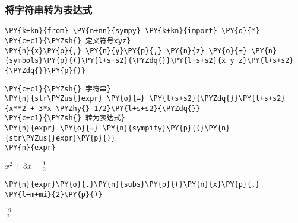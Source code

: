     \hypertarget{ux5c06ux5b57ux7b26ux4e32ux8f6cux4e3aux8868ux8fbeux5f0f}{%
\subsubsection{将字符串转为表达式}\label{ux5c06ux5b57ux7b26ux4e32ux8f6cux4e3aux8868ux8fbeux5f0f}}

    \begin{tcolorbox}[breakable, size=fbox, boxrule=1pt, pad at break*=1mm,colback=cellbackground, colframe=cellborder]
\begin{Verbatim}[commandchars=\\\{\}]
\PY{k+kn}{from} \PY{n+nn}{sympy} \PY{k+kn}{import} \PY{o}{*}
\PY{c+c1}{\PYZsh{} 定义符号xyz}
\PY{n}{x}\PY{p}{,} \PY{n}{y}\PY{p}{,} \PY{n}{z} \PY{o}{=} \PY{n}{symbols}\PY{p}{(}\PY{l+s+s2}{\PYZdq{}}\PY{l+s+s2}{x y z}\PY{l+s+s2}{\PYZdq{}}\PY{p}{)}
\end{Verbatim}
\end{tcolorbox}

    \begin{tcolorbox}[breakable, size=fbox, boxrule=1pt, pad at break*=1mm,colback=cellbackground, colframe=cellborder]
\begin{Verbatim}[commandchars=\\\{\}]
\PY{c+c1}{\PYZsh{} 字符串}
\PY{n}{str\PYZus{}expr} \PY{o}{=} \PY{l+s+s2}{\PYZdq{}}\PY{l+s+s2}{x**2 + 3*x \PYZhy{} 1/2}\PY{l+s+s2}{\PYZdq{}}
\PY{c+c1}{\PYZsh{} 转为表达式}
\PY{n}{expr} \PY{o}{=} \PY{n}{sympify}\PY{p}{(}\PY{n}{str\PYZus{}expr}\PY{p}{)}
\PY{n}{expr}
\end{Verbatim}
\end{tcolorbox}
 
            
    
    $\displaystyle x^{2} + 3 x - \frac{1}{2}$

    

    \begin{tcolorbox}[breakable, size=fbox, boxrule=1pt, pad at break*=1mm,colback=cellbackground, colframe=cellborder]
\begin{Verbatim}[commandchars=\\\{\}]
\PY{n}{expr}\PY{o}{.}\PY{n}{subs}\PY{p}{(}\PY{n}{x}\PY{p}{,} \PY{l+m+mi}{2}\PY{p}{)}
\end{Verbatim}
\end{tcolorbox}
 
            
    
    $\displaystyle \frac{19}{2}$
